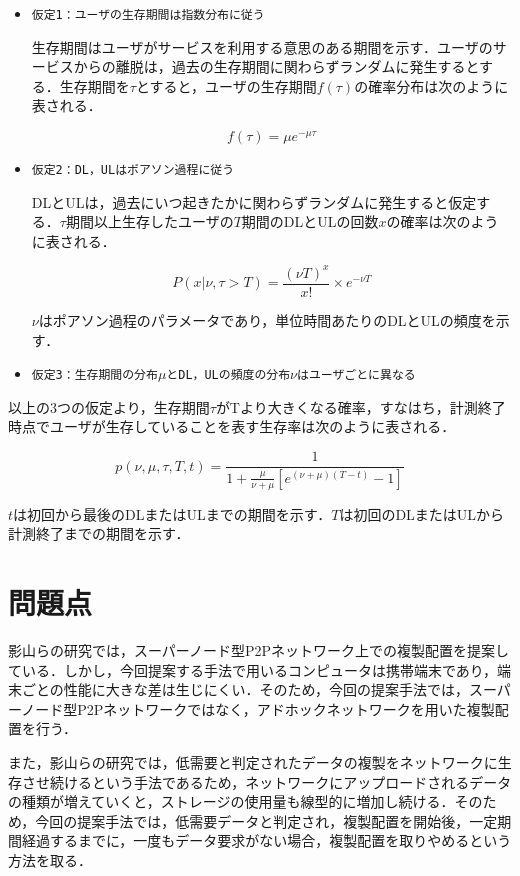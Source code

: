\documentclass[11pt]{jreport}
\begin{document}
\begin{itemize}
	\item {\tt 仮定1：ユーザの生存期間は指数分布に従う}
	\par 生存期間はユーザがサービスを利用する意思のある期間を示す．ユーザのサービスからの離脱は，過去の生存期間に関わらずランダムに発生するとする．生存期間を$\tau$とすると，ユーザの生存期間$f(\tau)$の確率分布は次のように表される．
	
	\[
	f( \tau )= \mu e^ {-\mu \tau}
	\]
	
	\item {\tt 仮定2：DL，ULはポアソン過程に従う}
	\par DLとULは，過去にいつ起きたかに関わらずランダムに発生すると仮定する．$\tau$期間以上生存したユーザの$T$期間のDLとULの回数$x$の確率は次のように表される．
	
	\[
	P(x| \nu,\tau>T)=\frac{(\nu T)^x}{x!} \times e^{- \nu T}
	\]
	
	$\nu$はポアソン過程のパラメータであり，単位時間あたりのDLとULの頻度を示す．
	
	\item {\tt 仮定3：生存期間の分布$\mu$とDL，ULの頻度の分布$\nu$はユーザごとに異なる}
\end{itemize}

\par 以上の3つの仮定より，生存期間$\tau$がTより大きくなる確率，すなはち，計測終了時点でユーザが生存していることを表す生存率は次のように表される．

\[
p(\nu, \mu, \tau, T, t)=\frac{1}{1+ \frac{\mu}{\nu + \mu} [e^{(\nu + \mu)(T-t)} -1] }
\]

\par $t$は初回から最後のDLまたはULまでの期間を示す．$T$は初回のDLまたはULから計測終了までの期間を示す．

\section{問題点}
影山ら\cite{kageyama}の研究では，スーパーノード型P2Pネットワーク上での複製配置を提案している．しかし，今回提案する手法で用いるコンピュータは携帯端末であり，端末ごとの性能に大きな差は生じにくい．そのため，今回の提案手法では，スーパーノード型P2Pネットワークではなく，アドホックネットワークを用いた複製配置を行う．
\par また，影山ら\cite{kageyama}の研究では，低需要と判定されたデータの複製をネットワークに生存させ続けるという手法であるため，ネットワークにアップロードされるデータの種類が増えていくと，ストレージの使用量も線型的に増加し続ける．そのため，今回の提案手法では，低需要データと判定され，複製配置を開始後，一定期間経過するまでに，一度もデータ要求がない場合，複製配置を取りやめるという方法を取る．
\end{document}
